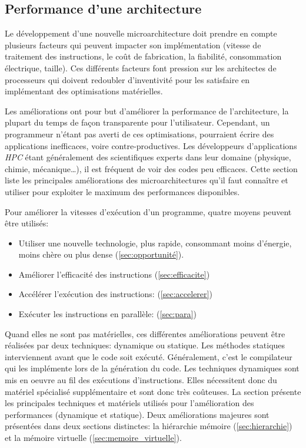 \subsection{Performance d'une architecture}


Le développement d'une nouvelle microarchitecture doit prendre en compte plusieurs facteurs qui peuvent impacter son implémentation (vitesse de traitement des instructions, le coût de fabrication, la fiabilité, consommation électrique, taille). Ces différents facteurs font pression sur les architectes de processeurs qui doivent redoubler d'inventivité pour les satisfaire en implémentant des optimisations matérielles.

Les améliorations ont pour but d'améliorer la performance de l'architecture, la plupart du temps de façon transparente pour l'utilisateur. Cependant, un programmeur n'étant pas averti de ces optimisations, pourraient écrire des applications inefficaces, voire contre-productives. Les développeurs d'applications \textit{HPC} étant généralement des scientifiques experts dans leur domaine (physique, chimie, mécanique…), il est fréquent de voir des codes peu efficaces. Cette section liste les principales améliorations des microarchitectures qu'il faut connaître et utiliser pour exploiter le maximum des performances disponibles. 


Pour améliorer la vitesses d'exécution d'un programme, quatre moyens peuvent être utilisés:
\begin{itemize}
    \item Utiliser une nouvelle technologie, plus rapide, consommant moins d'énergie, moins chère ou plus dense (\autoref{sec:opportunité}). 
    \item Améliorer l'efficacité des instructions (\autoref{sec:efficacite}) 
    \item Accélérer l'exécution des instructions: (\autoref{sec:accelerer})
    \item Exécuter les instructions en parallèle: (\autoref{sec:para})
\end{itemize}

Quand elles ne sont pas matérielles, ces différentes améliorations peuvent être réalisées par deux techniques: dynamique ou statique. Les méthodes statiques interviennent avant que le code soit exécuté. Généralement, c'est le compilateur qui les implémente lors de la génération du code. Les techniques dynamiques sont mis en oeuvre au fil des exécutions d'instructions. Elles nécessitent donc du matériel spécialisé supplémentaire et sont donc très coûteuses. La section présente les principales techniques et matériels utilisés pour l'amélioration des performances (dynamique et statique). Deux améliorations majeures sont présentées dans deux sections distinctes: la hiérarchie mémoire (\autoref{sec:hierarchie}) et la mémoire virtuelle (\autoref{sec:memoire_virtuelle}).







